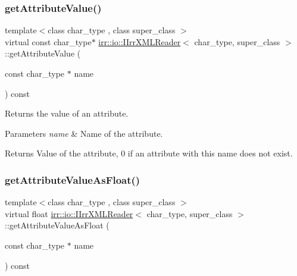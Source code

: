 \subsubsection{\texorpdfstring{get\+Attribute\+Value()}{getAttributeValue()}\hspace{0.1cm}{\footnotesize\ttfamily [2/2]}}
{\footnotesize\ttfamily template$<$class char\+\_\+type , class super\+\_\+class $>$ \\
virtual const char\+\_\+type$\ast$ \hyperlink{classirr_1_1io_1_1IIrrXMLReader}{irr\+::io\+::\+I\+Irr\+X\+M\+L\+Reader}$<$ char\+\_\+type, super\+\_\+class $>$\+::get\+Attribute\+Value (\begin{DoxyParamCaption}\item[{const char\+\_\+type $\ast$}]{name }\end{DoxyParamCaption}) const\hspace{0.3cm}{\ttfamily [pure virtual]}}



Returns the value of an attribute. 


\begin{DoxyParams}{Parameters}
{\em name} & Name of the attribute. \\
\hline
\end{DoxyParams}
\begin{DoxyReturn}{Returns}
Value of the attribute, 0 if an attribute with this name does not exist. 
\end{DoxyReturn}
\mbox{\label{classirr_1_1io_1_1IIrrXMLReader_a2b1032f213e9910827842f6057269235}} 
\subsubsection{\texorpdfstring{get\+Attribute\+Value\+As\+Float()}{getAttributeValueAsFloat()}\hspace{0.1cm}{\footnotesize\ttfamily [1/2]}}
{\footnotesize\ttfamily template$<$class char\+\_\+type , class super\+\_\+class $>$ \\
virtual float \hyperlink{classirr_1_1io_1_1IIrrXMLReader}{irr\+::io\+::\+I\+Irr\+X\+M\+L\+Reader}$<$ char\+\_\+type, super\+\_\+class $>$\+::get\+Attribute\+Value\+As\+Float (\begin{DoxyParamCaption}\item[{const char\+\_\+type $\ast$}]{name }\end{DoxyParamCaption}) const\hspace{0.3cm}{\ttfamily [pure virtual]}}



